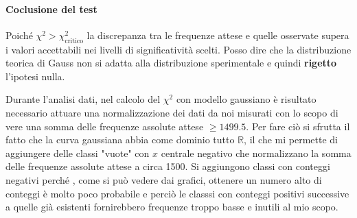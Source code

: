\documentclass{article}
\begin{document}
\paragraph{Coclusione del test} Poiché $\chi^2 > \chi^2_{\text{critico}}$ la discrepanza tra le frequenze attese e quelle osservate supera i valori accettabili nei livelli di significatività scelti. Posso dire che la distribuzione teorica di Gauss non si adatta alla distribuzione sperimentale e quindi \textbf{rigetto} l'ipotesi nulla.



\begin{center}
\end{center}

\noindent
Durante l'analisi dati, nel calcolo del $\chi^2$ con modello gaussiano è risultato necessario attuare una normalizzazione dei dati da noi misurati con lo scopo di vere una somma delle frequenze assolute attese $\geq 1499.5$. Per fare ciò si sfrutta il fatto che la curva gaussiana abbia come dominio tutto $\mathbb{R}$, il che mi permette di aggiungere delle classi "vuote" con $x$ centrale negativo che normalizzano la somma delle frequenze assolute attese a circa 1500. Si aggiungono classi con conteggi negativi perché , come si può vedere dai grafici, ottenere un numero alto di conteggi è molto poco probabile e perciò le classsi con conteggi positivi successive a quelle già esistenti fornirebbero frequenze troppo basse e inutili al mio scopo.
\end{document}
